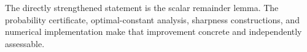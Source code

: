 \documentclass[11pt,a4paper]{article}
\theoremstyle{definition}
\begin{document}
\bigskip
The directly strengthened statement is the scalar remainder lemma.
The probability certificate, optimal-constant analysis, sharpness
constructions, and numerical implementation make that improvement
concrete and independently assessable.



\end{document}
